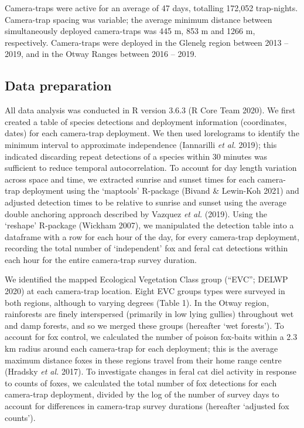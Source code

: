 \documentclass[11pt,a4paper,titlepage,twoside,openright]{style/unimelbthesis}
\begin{document}
\begin{mainmatter}
Camera-traps were active for an average of 47 days, totalling 172,052 trap-nights. Camera-trap spacing was variable; the average minimum distance between simultaneously deployed camera-traps was 445 m, 853 m and 1266 m, respectively. Camera-traps were deployed in the Glenelg region between 2013 -- 2019, and in the Otway Ranges between 2016 -- 2019.

\hypertarget{data-preparation}{%
\subsection{Data preparation}\label{data-preparation}}

All data analysis was conducted in R version 3.6.3 (R Core Team 2020). We first created a table of species detections and deployment information (coordinates, dates) for each camera-trap deployment. We then used lorelograms to identify the minimum interval to approximate independence (Iannarilli \emph{et al.} 2019); this indicated discarding repeat detections of a species within 30 minutes was sufficient to reduce temporal autocorrelation. To account for day length variation across space and time, we extracted sunrise and sunset times for each camera-trap deployment using the `maptools' R-package (Bivand \& Lewin-Koh 2021) and adjusted detection times to be relative to sunrise and sunset using the average double anchoring approach described by Vazquez \emph{et al.} (2019). Using the `reshape' R-package (Wickham 2007), we manipulated the detection table into a dataframe with a row for each hour of the day, for every camera-trap deployment, recording the total number of `independent' fox and feral cat detections within each hour for the entire camera-trap survey duration.

We identified the mapped Ecological Vegetation Class group (``EVC''; DELWP 2020) at each camera-trap location. Eight EVC groups types were surveyed in both regions, although to varying degrees (Table 1). In the Otway region, rainforests are finely interspersed (primarily in low lying gullies) throughout wet and damp forests, and so we merged these groups (hereafter `wet forests'). To account for fox control, we calculated the number of poison fox-baits within a 2.3 km radius around each camera-trap for each deployment; this is the average maximum distance foxes in these regions travel from their home range centre (Hradsky \emph{et al.} 2017). To investigate changes in feral cat diel activity in response to counts of foxes, we calculated the total number of fox detections for each camera-trap deployment, divided by the log of the number of survey days to account for differences in camera-trap survey durations (hereafter `adjusted fox counts').


\end{mainmatter}
\end{document}
